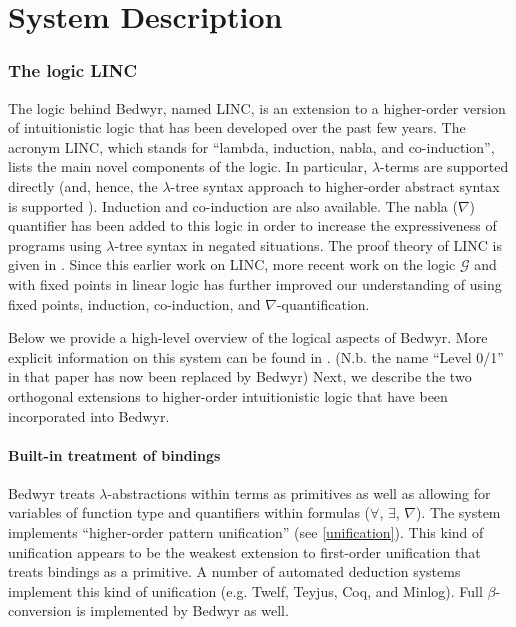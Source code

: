 \part{System Description}


\section{The logic LINC}
\label{linc}

The logic behind Bedwyr, named LINC, is an extension to a higher-order
version of intuitionistic logic that has been developed over the past
few years.  The acronym LINC, which stands for ``lambda, induction,
nabla, and co-induction'', lists the main novel components of the logic.
In particular, $\lambda$-terms are supported directly (and, hence, the
$\lambda$-tree syntax approach to higher-order abstract syntax is
supported \cite{miller00cl}).  Induction and co-induction are also
available.  The nabla ($\nabla$) quantifier has been added to this logic
in order to increase the expressiveness of programs using $\lambda$-tree
syntax in negated situations.  The proof theory of LINC is given in
\cite{miller05tocl,tiu04phd}.  Since this earlier work on LINC, more
recent work on the logic $\mathcal{G}$ \cite{gacek.twolevel,gacek11ic}
and with fixed points in linear logic \cite{baelde08phd,baelde12tocl}
has further improved our understanding of using fixed points, induction,
co-induction, and $\nabla$-quantification.

Below we provide a high-level overview of the logical aspects of Bedwyr.
More explicit information on this system can be found in
\cite{tiu05eshol}. (N.b. the name ``Level 0/1'' in that paper has now
been replaced by Bedwyr)  Next, we describe the two orthogonal
extensions to higher-order intuitionistic logic that have been
incorporated into Bedwyr.

\subsection{Built-in treatment of bindings}

Bedwyr treats $\lambda$-abstractions within terms as primitives as well
as allowing for variables of function type and quantifiers within
formulas ($\forall$, $\exists$, $\nabla$).  The system implements
``higher-order pattern unification'' (see \autoref{unification}).  This
kind of unification appears to be the weakest extension to first-order
unification that treats bindings as a primitive.  A number of automated
deduction systems implement this kind of unification (e.g. Twelf,
Teyjus, Coq, and Minlog).  Full $\beta$-conversion is implemented by
Bedwyr as well.

